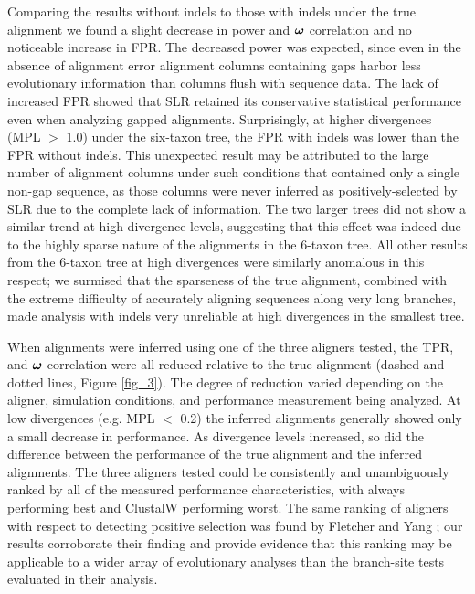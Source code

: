 \documentclass{mbe}
\begin{document}
Comparing the results without indels to those with indels under the
true alignment we found a slight decrease in power and $\bm{\omega}$
correlation and no noticeable increase in FPR. The decreased power was
expected, since even in the absence of alignment error alignment
columns containing gaps harbor less evolutionary information than
columns flush with sequence data. The lack of increased FPR showed
that SLR retained its conservative statistical performance even when
analyzing gapped alignments. Surprisingly, at higher divergences (MPL
$>$ 1.0) under the six-taxon tree, the FPR with indels was lower than
the FPR without indels. This unexpected result may be attributed to
the large number of alignment columns under such conditions that
contained only a single non-gap sequence, as those columns were never
inferred as positively-selected by SLR due to the complete lack of
information. The two larger trees did not show a similar trend at high
divergence levels, suggesting that this effect was indeed due to the
highly sparse nature of the alignments in the 6-taxon tree. All other
results from the 6-taxon tree at high divergences were similarly
anomalous in this respect; we surmised that the sparseness of the true
alignment, combined with the extreme difficulty of accurately aligning
sequences along very long branches, made \sw analysis with indels very
unreliable at high divergences in the smallest tree.

When alignments were inferred using one of the three aligners tested,
the TPR, \tpr{} and $\bm{\omega}$ correlation were all reduced relative to
the true alignment (dashed and dotted lines, Figure \ref{fig_3}). The
degree of reduction varied depending on the aligner, simulation
conditions, and performance measurement being analyzed. At low
divergences (e.g. MPL $<$ 0.2) the inferred alignments generally
showed only a small decrease in performance. As divergence levels
increased, so did the difference between the performance of the true
alignment and the inferred alignments. The three aligners tested could
be consistently and unambiguously ranked by all of the measured
performance characteristics, with \prankc always performing best and
ClustalW performing worst. The same ranking of aligners with respect
to detecting positive selection was found by Fletcher and Yang
\citeyearpar{Fletcher2010Effect}; our results corroborate their
finding and provide evidence that this ranking may be applicable to a
wider array of evolutionary analyses than the branch-site tests
evaluated in their analysis.
\end{document}
